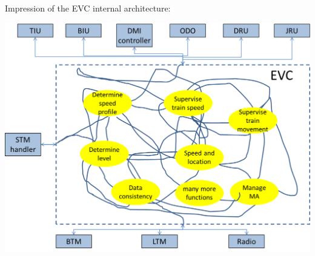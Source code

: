 \documentclass{template/openetcs_article}
\begin{document}
Impression of the EVC internal architecture:

\begin{center}
\includegraphics[scale=0.6]{figs/impression}

\end{center}
\end{document}
